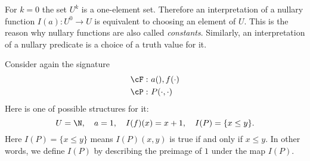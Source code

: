 \begin{page}
\setcounter{section}{1}
\setcounter{subsection}{4}
\setcounter{dfn}{11}
\label{portion:521}


For $k=0$ the set $U^k$ is a one-element set.
Therefore an interpretation of a nullary function $I(a) \colon U^0 \to U$ is equivalent to choosing an element of $U$.
This is the reason why nullary functions are also called \emph{constants}.
Similarly, an interpretation of a nullary predicate is a choice of a truth value for it.


\end{page}

\begin{page}
\setcounter{section}{1}
\setcounter{subsection}{4}
\setcounter{dfn}{12}
\label{portion:523}

\begin{exl}
Consider again the signature
\begin{align*}
\cF:\ &a(), f(\cdot) \\
\cP:\ &P(\cdot, \cdot)
\end{align*}
Here is one of possible structures for it:
\[
U = \N, \quad a = 1, \quad I(f)(x) = x+1, \quad I(P) = \{x \le y\}.
\]
Here $I(P) = \{x \le y\}$ means $I(P)(x,y)$ is true if and only if $x \le y$.
In other words, we define $I(P)$ by describing the preimage of $1$ under the map $I(P)$.
\end{exl}

\end{page}

